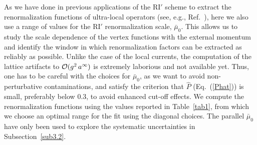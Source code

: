 \documentclass[12pt,tighten,nofootinbib,amssymb,floatfix]{article}
\begin{document}
\vspace*{0.35cm}
As we have done in previous applications of the RI$'$ scheme to extract the renormalization functions of ultra-local operators
(see, e.g., Ref.~\cite{Alexandrou:2015sea}), here we also use a range of values for the RI$'$ renormalization scale, 
$\bar\mu_0$. This allows us to study the scale dependence of the vertex functions with the external
momentum and identify the window in  which renormalization factors can be extracted as reliably as possible.
Unlike the case of the local currents, the computation of the lattice artifacts to ${\cal O}(g^2\,a^\infty)$
is extremely laborious and not available yet. Thus, one has to be careful with the choices for $\bar\mu_0$, 
as we want to avoid non-perturbative contaminations, and satisfy the criterion that $\hat{P}$ (Eq.~(\ref{Phat})) is small, 
preferably below 0.3, to avoid enhanced cut-off effects. 
We compute the renormalization functions using the values reported in Table~\ref{tab1}, from which we choose an optimal 
range for the fit using the diagonal choices. The parallel $\bar\mu_0$ have only been used to explore the 
systematic uncertainties in Subsection~\ref{sub3.2}. 
\end{document}
